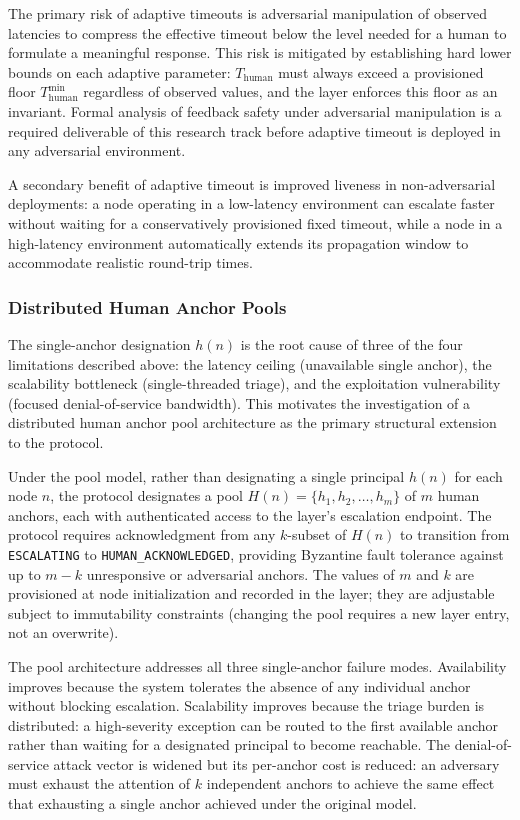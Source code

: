 The primary risk of adaptive timeouts is adversarial manipulation of observed latencies to compress the effective timeout below the level needed for a human to formulate a meaningful response. This risk is mitigated by establishing hard lower bounds on each adaptive parameter: $T_{\text{human}}$ must always exceed a provisioned floor $T_{\text{human}}^{\min}$ regardless of observed values, and the \fact{} layer enforces this floor as an invariant. Formal analysis of feedback safety under adversarial manipulation is a required deliverable of this research track before adaptive timeout is deployed in any adversarial environment.

A secondary benefit of adaptive timeout is improved liveness in non-adversarial deployments: a node operating in a low-latency environment can escalate faster without waiting for a conservatively provisioned fixed timeout, while a node in a high-latency environment automatically extends its propagation window to accommodate realistic round-trip times.

\subsubsection{Distributed Human Anchor Pools}
\label{sec:fw:anchor-pools}

The single-anchor designation $h(n)$ is the root cause of three of the four limitations described above: the latency ceiling (unavailable single anchor), the scalability bottleneck (single-threaded triage), and the exploitation vulnerability (focused denial-of-service bandwidth). This motivates the investigation of a distributed human anchor pool architecture as the primary structural extension to the protocol.

Under the pool model, rather than designating a single principal $h(n)$ for each node $n$, the protocol designates a pool $H(n) = \{h_1, h_2, \ldots, h_m\}$ of $m$ human anchors, each with authenticated access to the \fact{} layer's escalation endpoint. The protocol requires acknowledgment from any $k$-subset of $H(n)$ to transition from \texttt{ESCALATING} to \texttt{HUMAN\_ACKNOWLEDGED}, providing Byzantine fault tolerance against up to $m - k$ unresponsive or adversarial anchors. The values of $m$ and $k$ are provisioned at node initialization and recorded in the \fact{} layer; they are adjustable subject to immutability constraints (changing the pool requires a new \fact{} layer entry, not an overwrite).

The pool architecture addresses all three single-anchor failure modes. Availability improves because the system tolerates the absence of any individual anchor without blocking escalation. Scalability improves because the triage burden is distributed: a high-severity exception can be routed to the first available anchor rather than waiting for a designated principal to become reachable. The denial-of-service attack vector is widened but its per-anchor cost is reduced: an adversary must exhaust the attention of $k$ independent anchors to achieve the same effect that exhausting a single anchor achieved under the original model.

